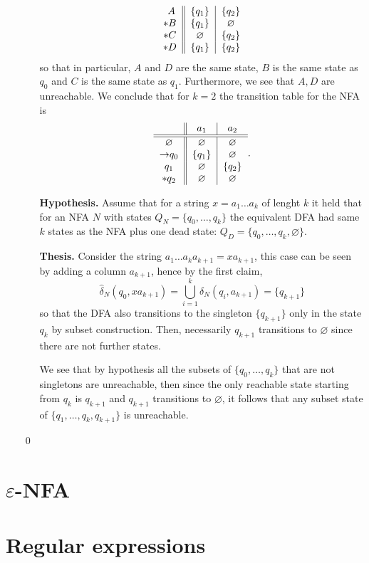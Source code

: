 \documentclass{article}
\newcommand{\NN}[2]{
    \hat{\delta}_{N}(#1, #2)
}
\theoremstyle{remark}
\begin{document}
\begin{enumerate}
\begin{enumerate}
\[\begin{tabular}{c||c|c}
$$                $A$ & $\{q_1\}$ & $\{q_2\}$\\
                $*B$ & $\{q_1\}$ & $\varnothing$\\
                $*C$ & $\varnothing$ & $\{q_2\}$\\
                $*D$ & $\{q_1\}$ & $\{q_2\}$
            \end{tabular}
        \]
        so that in particular, $A$ and $D$ are the same state, $B$ is the same state as $q_0$ and $C$ is the same state as $q_1$.
        Furthermore, we see that $A, D$ are unreachable. 
        We conclude that for $k = 2$ the transition table for the NFA is
        \[
            \begin{tabular}{c||c|c}
                & $a_1$ & $a_2$\\
                \hline\hline
                $\varnothing$ & $\varnothing$ & $\varnothing$\\
                $\rightarrow$$q_0$ & $\{q_1\}$ & $\varnothing$\\
                $q_1$ & $\varnothing$ & $\{q_2\}$ \\
                $*q_2$ & $\varnothing$ & $\varnothing$  
            \end{tabular}.
        \]

        \item[\textbf{Hypothesis.}]
        Assume that for a string $x = a_1\dots a_{k}$ of lenght $k$ it held that for an NFA $N$ with states $Q_N = \{q_0,\dots, q_k\}$ the equivalent DFA
        had same $k$ states as the NFA plus one dead state: $Q_D = \{q_0,\dots, q_k, \varnothing\}$.

        \item[\textbf{Thesis.}]
        Consider the string $a_1\dots a_k a_{k+1} = xa_{k+1}$, 
        this case can be seen by adding a column $a_{k+1}$, hence
        by the first claim,
        \[
        \NN{q_0}{xa_{k+1}} = \bigcup_{i=1}^{k}\delta_N(q_i,a_{k+1}) = \{q_{k+1}\}
        \]
        so that the DFA also transitions to the singleton $\{q_{k+1}\}$ only in the state $q_k$ by subset construction.
        Then, necessarily $q_{k+1}$ transitions to $\varnothing$ since there are not further states.

        We see that by hypothesis all the subsets of $\{q_0,\dots,q_k\}$
        that are not singletons are unreachable, then since the only 
        reachable state starting from $q_{k}$ is $q_{k+1}$ and $q_{k+1}$ transitions to $\varnothing$,
        it follows that any subset state of $\{q_1,\dots, q_{k},q_{k+1}\}$ is unreachable.
    \end{enumerate}
    \begin{flushright}
        \qed
    \end{flushright}
\end{enumerate}
\section*{$\varepsilon$-NFA}

\section*{Regular expressions}
\end{document}
